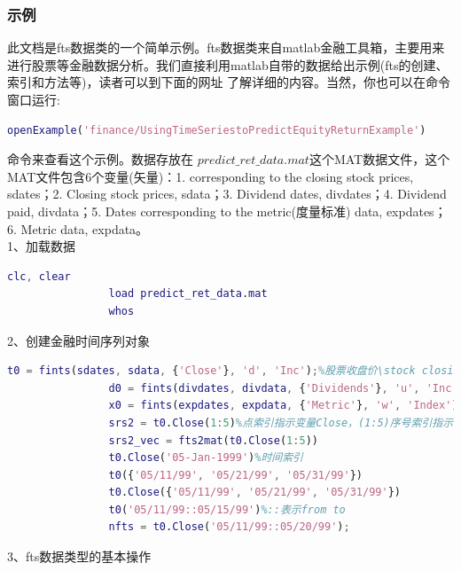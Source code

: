         \subsubsection{ 示例}
            \par
            此文档是fts数据类的一个简单示例。fts数据类来自matlab金融工具箱，主要用来进行股票等金融数据分析。我们直接利用matlab自带的数据给出示例(fts的创建、索引和方法等)，读者可以到下面的网址 了解详细的内容。当然，你也可以在命令窗口运行:
            \begin{lstlisting}[language= Matlab]
            openExample('finance/UsingTimeSeriestoPredictEquityReturnExample')
            \end{lstlisting}
            命令来查看这个示例。数据存放在 $predict\_ret\_data.mat$这个MAT数据文件，这个MAT文件包含6个变量(矢量)：1. corresponding to the closing stock prices, sdates；2. Closing stock prices, sdata；3. Dividend dates, divdates；4. Dividend paid, divdata；5. Dates corresponding to the metric(度量标准) data, expdates；6. Metric data, expdata。\\
            1、加载数据
                \begin{lstlisting}[language=Matlab]
                clc, clear
                load predict_ret_data.mat
                whos
                \end{lstlisting}
            2、创建金融时间序列对象
                \begin{lstlisting}[language=Matlab]
                t0 = fints(sdates, sdata, {'Close'}, 'd', 'Inc');%股票收盘价\stock closing prices
                d0 = fints(divdates, divdata, {'Dividends'}, 'u', 'Inc');%股息支付\dividend payments
                x0 = fints(expdates, expdata, {'Metric'}, 'w', 'Index');%explanatory data
                srs2 = t0.Close(1:5)%点索引指示变量Close，(1:5)序号索引指示前5行
                srs2_vec = fts2mat(t0.Close(1:5))
                t0.Close('05-Jan-1999')%时间索引
                t0({'05/11/99', '05/21/99', '05/31/99'})
                t0.Close({'05/11/99', '05/21/99', '05/31/99'})
                t0('05/11/99::05/15/99')%::表示from to
                nfts = t0.Close('05/11/99::05/20/99');
                \end{lstlisting}
            3、fts数据类型的基本操作

